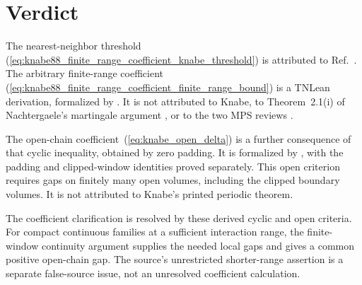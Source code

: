 \documentclass{article}
\begin{document}
\section{Verdict}

The nearest-neighbor threshold
(\ref{eq:knabe88_finite_range_coefficient_knabe_threshold}) is attributed to
Ref.~\cite{Knabe1988Energy}. The arbitrary finite-range coefficient
(\ref{eq:knabe88_finite_range_coefficient_finite_range_bound}) is a TNLean
derivation, formalized by
.
It is not attributed to Knabe, to
Theorem~2.1(i) of Nachtergaele's martingale argument
\cite{Nachtergaele1996Spectral}, or to the two MPS reviews
\cite{PerezGarcia2007Matrix,Cirac2021Matrix}.

The open-chain coefficient~(\ref{eq:knabe_open_delta}) is a further consequence
of that cyclic inequality, obtained by zero padding. It is formalized by
, with the
padding and clipped-window identities proved separately. This open criterion
requires gaps on finitely many open volumes, including the clipped boundary
volumes. It is not attributed to Knabe's printed periodic theorem.

The coefficient clarification is resolved by these derived cyclic and open
criteria. For compact continuous families at a sufficient interaction range,
the finite-window continuity argument supplies the needed local gaps and
gives a common positive open-chain gap. The source's unrestricted shorter-range
assertion is a separate false-source issue, not an unresolved coefficient
calculation.



\end{document}
